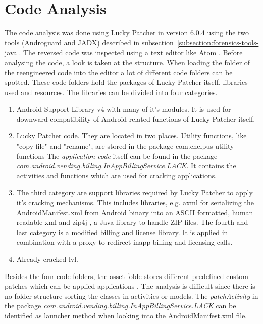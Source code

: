 \section{Code Analysis} \label{section:luckypatcher-analysis}
The code analysis was done using Lucky Patcher in version 6.0.4 using the two tools (Androguard and JADX) described in subsection~\ref{subsection:forensics-tools-java}.
The reversed code was inspected using a text editor like Atom \cite{atom}.
\newline
Before analysing the code, a look is taken at the structure.
When loading the folder of the reengineered code into the editor a lot of different code folders can be spotted.
These code folders hold the packages of Lucky Patcher itself. libraries used and resources.
The libraries can be divided into four categories.
\begin{enumerate}
\item Android Support Library v4 with many of it's modules.
It is used for downward compatibility of Android related functions of Lucky Patcher itself.
\item Lucky Patcher code.
They are located in two places.
Utility functions, like "copy file" and "rename", are stored in the package com.chelpus utility functions
The \textit{application code} itself can be found in the package \textit{com.android.vending.billing.InAppBillingService.LACK}.
It contains the activities and functions which are used for cracking applications.
\item The third category are support libraries required by Lucky Patcher to apply it's cracking mechanisms.
This includes libraries, e.g. axml \cite{axml} for serializing the AndroidManifest.xml from Android binary into an ASCII formatted, human readable xml and zip4j \cite{zip4j}, a Java library to handle ZIP files.
The fourth and last category is a modified billing and license library.
It is applied in combination with a proxy to redirect inapp billing and licensing calls.
\item Already cracked \gls{lvl}.
\end{enumerate}
Besides the four code folders, the asset folde stores different predefined custom patches which can be applied applications \cite{munteanLicense}.
\newline
The analysis is difficult since there is no folder structure sorting the classes in activities or models.
The \textit{patchActivity} in the package \textit{com.android.vending.billing.InAppBillingService.LACK} can be identified as launcher method when looking into the AndroidManifest.xml file.
